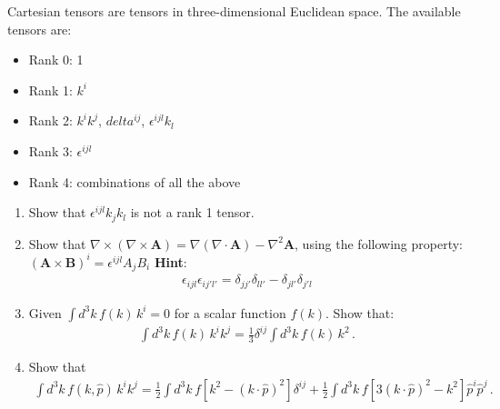 Cartesian tensors are tensors in three-dimensional Euclidean space. The available tensors are: \begin{itemize}
    \item Rank 0: 1
    \item Rank 1: $k^i$
    \item Rank 2: $k^i k^j$, $delta^{ij}$, $\epsilon^{ijl} k_l$
    \item Rank 3: $\epsilon^{ijl}$
    \item Rank 4: combinations of all the above
\end{itemize}

\begin{enumerate}
    \item  Show that $\epsilon^{ijl} k_j k_l$ is not a rank 1 tensor.
    \item  Show that $\nabla \times (\nabla \times \mathbf{A}) = \nabla (\nabla \cdot \mathbf{A}) - \nabla^2 \mathbf{A}$, using the following property: $(\mathbf{A} \times \mathbf{B})^i = \epsilon^{ijl} A_{j}B_{i}$
          \textbf{Hint}:
          \begin{align}
              \epsilon_{ijl} \epsilon_{ij'l'} = \delta_{jj'} \delta_{ll'}- \delta_{jl'}\delta_{j'l}
          \end{align}
    \item Given $\int d^3 k \, f(k) \, k^i = 0$ for a scalar function  $f(k)$. Show that:
          \begin{align}
              \int d^3 k \, f(k) \, k^i k^j = \frac{1}{3} \delta^{ij} \int d^3 k \, f(k) \, k^2\,.
          \end{align}
    \item Show that
          \begin{align}
              \int d^3 k \, f(k, \hat{p}) \, k^i k^j = \frac{1}{2} \int d^3 k \, f\left[k^2 - (k \cdot \hat{p})^2\right] \delta^{ij} + \frac{1}{2} \int d^3 k \, f\left[3(k \cdot \hat{p})^2 - k^2\right] \hat{p}^i \hat{p}^j\,.
          \end{align}
\end{enumerate}